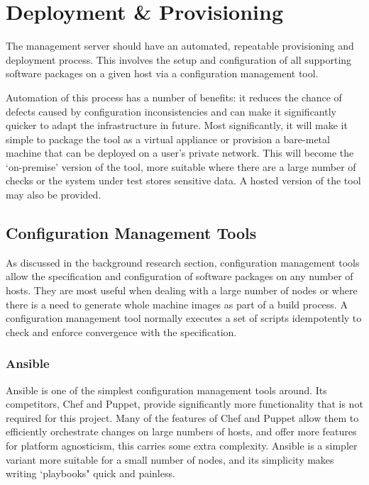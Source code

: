 \documentclass{cshonours}
\begin{document}
\pagebreak
\section{Deployment \& Provisioning}

The management server should have an automated, repeatable provisioning and deployment process. This involves the setup and configuration of all supporting software packages on a given host via a configuration management tool.

Automation of this process has a number of benefits: it reduces the chance of defects caused by configuration inconsistencies and can make it significantly quicker to adapt the infrastructure in future. Most significantly, it will make it simple to package the tool as a virtual appliance or provision a bare-metal machine that can be deployed on a user's private network. This will become the `on-premise' version of the tool, more suitable where there are a large number of checks or the system under test stores sensitive data. A hosted version of the tool may also be provided.

\subsection{Configuration Management Tools}

As discussed in the background research section, configuration management tools allow the specification and configuration of software packages on any number of hosts. They are most useful when dealing with a large number of nodes or where there is a need to generate whole machine images as part of a build process. A configuration management tool normally executes a set of scripts idempotently to check and enforce convergence with the specification.

\subsubsection{Ansible}

Ansible is one of the simplest configuration management tools around. Its competitors, Chef and Puppet, provide significantly more functionality that is not required for this project. Many of the features of Chef and Puppet allow them to efficiently orchestrate changes on large numbers of hosts, and offer more features for platform agnosticism, this carries some extra complexity. Ansible is a simpler variant more suitable for a small number of nodes, and its simplicity makes writing `playbooks" quick and painless.
\end{document}
